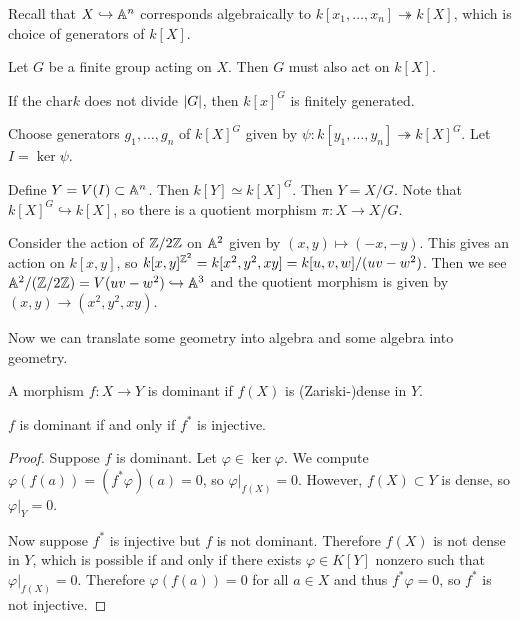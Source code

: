 \documentclass[twoside, 10pt]{article}
\begin{document}
    Recall that $X \hookrightarrow \mathbb{A}^n$ corresponds algebraically to $k[x_1,
    \ldots, x_n] \twoheadrightarrow k[X]$, which is choice of generators of
    $k[X]$.

    Let $G$ be a finite group acting on $X$. Then $G$ must also act on $k[X]$.
    \begin{thm} If the $\mathrm{char} k$ does not divide $\lvert G\rvert$, then
    $k[x]^G$ is finitely generated.  \end{thm} Choose generators $g_1, \ldots,
    g_n$ of $k[X]^G$ given by $\psi: k[y_1, \ldots, y_n] \twoheadrightarrow
    k[X]^G$. Let $I = \ker \psi$.  \begin{defn}
        Define $Y = V(I) \subset \mathbb{A}^n$. Then $k[Y] \simeq k[X]^G$. Then $Y =
        X/G$. Note that $k[X]^G \hookrightarrow k[X]$, so there is a quotient
    morphism $\pi: X \rightarrow X/G$.  \end{defn}
    

    \begin{exm} Consider the action of $\mathbb{Z}/2\mathbb{Z}$ on $\mathbb{A}^2$ given by $(x,y)
        \mapsto (-x,-y)$. This gives an action on $k[x,y]$, so $k[x,y]^{\mathbb{Z}^2} =
        k[x^2,y^2,xy] = k[u,v,w]/(uv-w^2)$. Then we see $\mathbb{A}^2/(\mathbb{Z}/2\mathbb{Z}) =
        V(uv-w^2) \hookrightarrow \mathbb{A}^3$ and the quotient morphism is given by
    $(x,y) \rightarrow (x^2,y^2,xy)$.  \end{exm}

    Now we can translate some geometry into algebra and some algebra into
    geometry.

    \begin{defn}[Dominance] A morphism $f:X \rightarrow Y$ is dominant if
    $f(X)$ is (Zariski-)dense in $Y$.  \end{defn}

    \begin{prop} $f$ is dominant if and only if $f^*$ is injective.
        \begin{proof} Suppose $f$ is dominant. Let $\varphi \in \ker \varphi$.
            We compute $\varphi(f(a)) = (f^*\varphi)(a) = 0$, so $\varphi
            |_{f(X)} = 0$.  However, $f(X) \subset Y$ is dense, so $\varphi|_Y
            = 0$.  

            Now suppose $f^*$ is injective but $f$ is not dominant. Therefore
            $f(X)$ is not dense in $Y$, which is possible if and only if there
            exists $\varphi \in K[Y]$ nonzero such that $\varphi|_{f(X)} = 0$.
            Therefore $\varphi(f(a)) = 0$ for all $a \in X$ and thus
        $f^*\varphi = 0$, so $f^*$ is not injective.  \end{proof} \end{prop}
\end{document}
